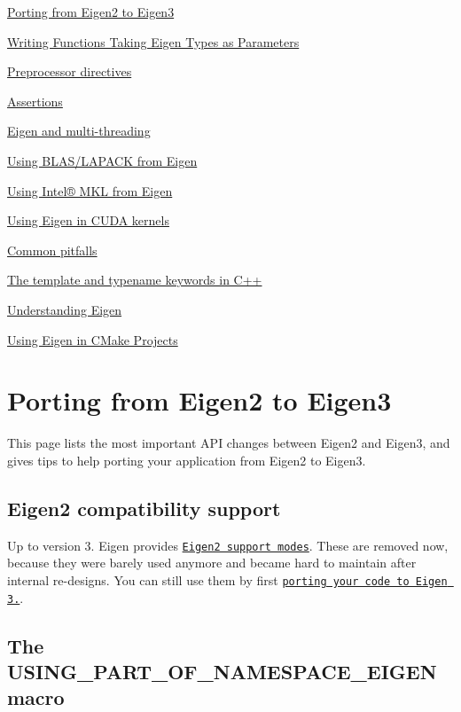 
\begin{DoxyItemize}
\item \hyperlink{Eigen2ToEigen3}{Porting from Eigen2 to Eigen3}
\item \hyperlink{TopicFunctionTakingEigenTypes}{Writing Functions Taking Eigen Types as Parameters}
\item \hyperlink{TopicPreprocessorDirectives}{Preprocessor directives}
\item \hyperlink{TopicAssertions}{Assertions}
\item \hyperlink{TopicMultiThreading}{Eigen and multi-\/threading}
\item \hyperlink{TopicUsingBlasLapack}{Using B\+L\+A\+S/\+L\+A\+P\+A\+CK from Eigen}
\item \hyperlink{TopicUsingIntelMKL}{Using Intel® M\+KL from Eigen}
\item \hyperlink{TopicCUDA}{Using Eigen in C\+U\+DA kernels}
\item \hyperlink{TopicPitfalls}{Common pitfalls}
\item \hyperlink{TopicTemplateKeyword}{The template and typename keywords in C++}
\item \hyperlink{UserManual_UnderstandingEigen}{Understanding Eigen}
\item \hyperlink{TopicCMakeGuide}{Using Eigen in C\+Make Projects} 
\end{DoxyItemize}\hypertarget{Eigen2ToEigen3}{}\section{Porting from Eigen2 to Eigen3}\label{Eigen2ToEigen3}
This page lists the most important A\+PI changes between Eigen2 and Eigen3, and gives tips to help porting your application from Eigen2 to Eigen3.\hypertarget{_eigen2_to_eigen3_CompatibilitySupport}{}\subsection{Eigen2 compatibility support}\label{_eigen2_to_eigen3_CompatibilitySupport}
Up to version 3. Eigen provides \href{http://eigen.tuxfamily.org/dox-3.2/Eigen2SupportModes.html}{\tt Eigen2 support modes}. These are removed now, because they were barely used anymore and became hard to maintain after internal re-\/designs. You can still use them by first \href{http://eigen.tuxfamily.org/dox-3.2/Eigen2ToEigen3.html}{\tt porting your code to Eigen 3.}.\hypertarget{_eigen2_to_eigen3_Using}{}\subsection{The U\+S\+I\+N\+G\+\_\+\+P\+A\+R\+T\+\_\+\+O\+F\+\_\+\+N\+A\+M\+E\+S\+P\+A\+C\+E\+\_\+\+E\+I\+G\+E\+N macro}\label{_eigen2_to_eigen3_Using}
